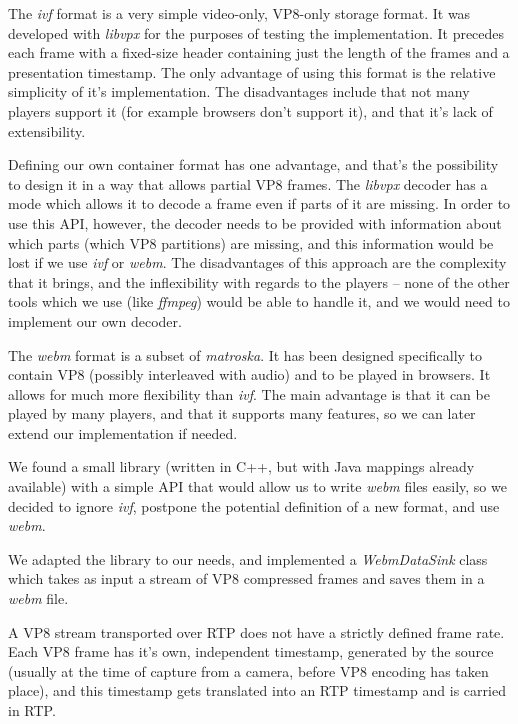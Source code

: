 \documentclass[twoside,openright,a4paper,12pt,english]{article}
\begin{document}
The \emph{ivf} format is a very simple video-only, VP8-only storage format. It
was developed with \emph{libvpx} for the purposes of testing the
implementation. It precedes each frame with a fixed-size header containing just
the length of the frames and a presentation timestamp. The only advantage of
using this format is the relative simplicity of it's implementation. The disadvantages
include that not many players support it (for example browsers don't support it), and
that it's lack of extensibility.

Defining our own container format has one advantage, and that's the possibility
to design it in a way that allows partial VP8 frames. The \emph{libvpx} decoder
has a mode which allows it to decode a frame even if parts of it are missing.
In order to use this API, however, the decoder needs to be provided with
information about which parts (which VP8 partitions) are missing, and this
information would be lost if we use \emph{ivf} or \emph{webm}. The
disadvantages of this approach are the complexity that it brings, and the
inflexibility with regards to the players -- none of the other tools which
we use (like \emph{ffmpeg}) would be able to handle it, and we would need to
implement our own decoder.

The \emph{webm}\cite{webm} format is a subset of
\emph{matroska}\cite{matroska}. It has been designed
specifically to contain VP8 (possibly interleaved with audio) and to be played
in browsers. It allows for much more flexibility than \emph{ivf}. The main advantage
is that it can be played by many players, and that it supports many features,
so we can later extend our implementation if needed.

\smallskip
We found a small library (written in C++, but with Java mappings already
available) with a simple API that would allow us to write \emph{webm} files
easily, so we decided to ignore \emph{ivf}, postpone the potential
definition of a new format, and use \emph{webm}. 

We adapted the library to our needs, and implemented a \emph{WebmDataSink} class which takes
as input a stream of VP8 compressed frames and saves them in a \emph{webm} file.

\medskip
A VP8 stream transported over RTP does not have a strictly defined frame rate.
Each VP8 frame has it's own, independent timestamp, generated by the source (usually at the
time of capture from a camera, before VP8 encoding has taken place), and this timestamp
gets translated into an RTP timestamp and is carried in RTP.
\end{document}

